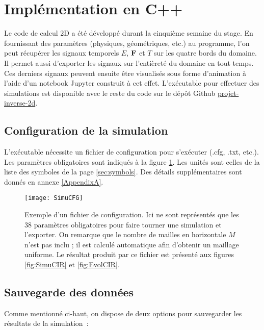 \section{Implémentation en C++}

Le code de calcul 2D a été développé durant la cinquième semaine du stage. En fournissant des paramètres (physiques, géométriques, etc.) au programme, l'on peut récupérer les signaux temporels $E$, $\mathbf{F}$ et $T$ sur les quatre bords du domaine. Il permet aussi d'exporter les signaux sur l'entièreté du domaine en tout temps. Ces derniers signaux peuvent ensuite être visualisés sous forme d'animation à l'aide d'un notebook Jupyter construit à cet effet. L'exécutable pour effectuer des simulations est disponible avec le reste du code sur le dépôt Github \href{https://github.com/desmond-rn/projet-inverse-2d}{projet-inverse-2d}.

\subsection{Configuration de la simulation}

L'exécutable nécessite un fichier de configuration pour s'exécuter (.cfg, .txt, etc.). Les paramètres obligatoires sont indiqués à la figure \ref{fig:SimuCFG}. Les unités sont celles de la liste des symboles de la page \ref{sec:symbols}. Des détails supplémentaires sont donnés en annexe \ref{AppendixA}.

\begin{figure}[!h]
\centering
\texttt{[image: SimuCFG]} 
\decoRule
\caption[SimuCFG]{Exemple d'un fichier de configuration. Ici ne sont représentés que les 38 paramètres obligatoires pour faire tourner une simulation et l'exporter. On remarque que le nombre de mailles en horizontale $M$ n'est pas inclu ; il est calculé automatique afin d'obtenir un maillage uniforme. Le résultat produit par ce fichier est présenté aux figures \ref{fig:SimuCIR} et \ref{fig:EvolCIR}.}
\label{fig:SimuCFG}
\end{figure}

\subsection{Sauvegarde des données}

Comme mentionné ci-haut, on dispose de deux options pour sauvegarder les résultats de la simulation :

